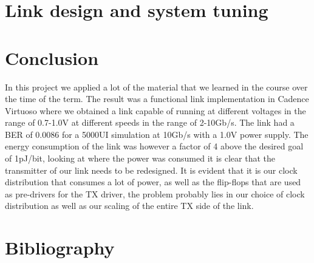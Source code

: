 \documentclass[12pt,journal,compsoc,onecolumn]{IEEEtran}
\begin{document}
\cleardoublepage
\section{Link design and system tuning}




\section{Conclusion}
In this project we applied a lot of the material that we learned in the course over the time of the term. The result was a functional link implementation in Cadence Virtuoso where we obtained a link capable of running at different voltages in the range of 0.7-1.0V at different speeds in the range of 2-10Gb/s. The link had a BER of 0.0086 for a 5000UI simulation at 10Gb/s with a 1.0V power supply. The energy consumption of the link was however a factor of 4 above the desired goal of 1pJ/bit, looking at where the power was consumed it is clear that the transmitter of our link needs to be redesigned. It is evident that it is our clock distribution that consumes a lot of power, as well as the flip-flops that are used as pre-drivers for the TX driver, the problem probably lies in our choice of clock distribution as well as our scaling of the entire TX side of the link.


%



\ifCLASSOPTIONcaptionsoff
  \newpage
\fi

\newpage
\section{Bibliography}
{}

\end{document}
